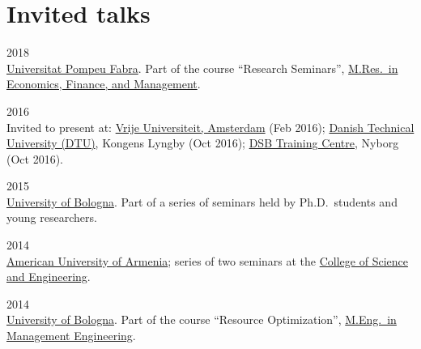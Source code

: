 \section*{Invited talks}

\begin{paracol}{2}
  \textsc{2018}
\switchcolumn
  \\
  \href{https://www.upf.edu}{Universitat Pompeu Fabra}. Part of the course ``Research Seminars'', \href{https://www.upf.edu/web/econ/research-master}{M.Res.\ in Economics, Finance, and Management}.
\end{paracol}

\begin{paracol}{2}
  \textsc{2016}
\switchcolumn
  \\
  Invited to present at: \href{https://www.vu.nl/}{Vrije Universiteit, Amsterdam} (Feb 2016); \href{https://www.dtu.dk/}{Danish Technical University (DTU)}, Kongens Lyngby (Oct 2016); \href{https://www.dsb.dk/}{DSB Training Centre}, Nyborg (Oct 2016).
\end{paracol}

\begin{paracol}{2}
  \textsc{2015}
\switchcolumn
  \\
  \href{https://www.unibo.it}{University of Bologna}. Part of a series of seminars held by Ph.D.\ students and young researchers.
\end{paracol}

\begin{paracol}{2}
  \textsc{2014}
\switchcolumn
  \\
  \href{https://www.aua.am/}{American University of Armenia}; series of two seminars at the \href{http://cse.aua.am/}{College of Science and Engineering}.
\end{paracol}

\begin{paracol}{2}
  \textsc{2014}
\switchcolumn
  \\
  \href{https://www.unibo.it}{University of Bologna}. Part of the course ``Resource Optimization'', \href{https://corsi.unibo.it/magistrale/IngegneriaGestionale}{M.Eng.\ in Management Engineering}.
\end{paracol}
